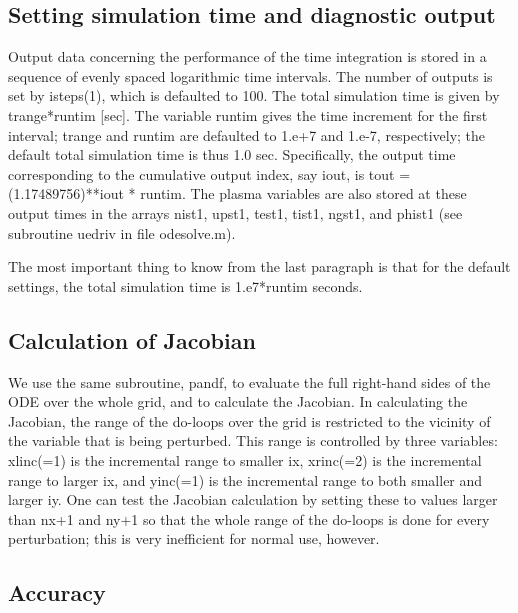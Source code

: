 \documentclass [12pt]{article}
\begin{document}
\subsection{Setting simulation time and diagnostic output}

Output data concerning the performance of the time integration is
stored in a sequence of evenly spaced logarithmic time intervals.  The
number of outputs is set by isteps(1), which is defaulted to 100.  The
total simulation time is given by trange*runtim [sec].  The variable
runtim gives the time increment for the first interval; trange and
runtim are defaulted to 1.e+7 and 1.e-7, respectively; the default
total simulation time is thus 1.0 sec.  Specifically, the output time
corresponding to the cumulative output index, say iout, is tout =
(1.17489756)**iout * runtim.  The plasma variables are also stored at
these output times in the arrays nist1, upst1, test1, tist1, ngst1,
and phist1 (see subroutine uedriv in file odesolve.m).

The most important thing to know from the last paragraph is that for the
default settings, the total simulation time is 1.e7*runtim seconds.

\subsection{Calculation of Jacobian}

We use the same subroutine, pandf, to evaluate the full right-hand sides
of the ODE over the whole grid, and to calculate the Jacobian.  In
calculating the Jacobian, the range of the do-loops over the grid is
restricted to the vicinity of the variable that is being perturbed.  This
range is controlled by three variables: xlinc(=1) is the incremental range
to smaller ix, xrinc(=2) is the incremental range to larger ix, and
yinc(=1) is the incremental range to both smaller and larger iy.  One can
test the Jacobian calculation by setting these to values larger than nx+1
and ny+1 so that the whole range of the do-loops is done for every
perturbation; this is very inefficient for normal use, however.

\subsection{Accuracy}
\end{document}
